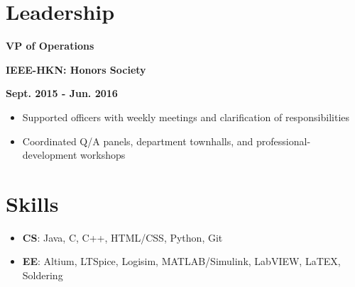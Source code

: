 \documentclass[12pt]{article}
\newcommand\textbox[1]{\parbox{.333\textwidth}{#1}}
\newcommand{\textlcr}[3]{\textbox{\textbf{#1}\hfill}\textbox{\hfil \textbf{#2}\hfil}\textbox{\hfill \textbf{#3}}}
\begin{document}
\section*{Leadership}
\vspace*{-1em}\makebox[\linewidth]{\rule{\textwidth}{0.4pt}}

\textlcr{VP of Operations}{IEEE-HKN: Honors Society}{Sept. 2015 - Jun. 2016}
\begin{itemize}
\item Supported officers with weekly meetings and clarification of responsibilities
\item Coordinated Q/A panels, department townhalls, and professional-development workshops
\end{itemize}

\section*{Skills}
\vspace*{-1em}\makebox[\linewidth]{\rule{\textwidth}{0.4pt}}
\begin{itemize}
\item \textbf{CS}: Java, C, C++, HTML/CSS, Python, Git
\item \textbf{EE}: Altium, LTSpice, Logisim, MATLAB/Simulink, LabVIEW, LaTEX, Soldering
\end{itemize}
\end{document}
